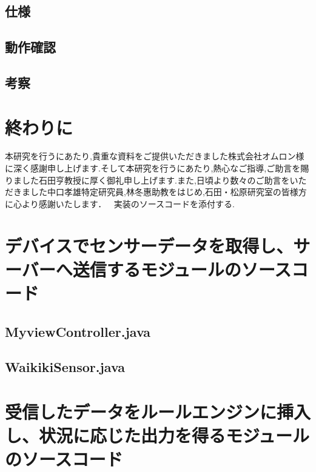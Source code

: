 \documentclass{kuisthesis}			%
\begin{document}
\subsection{仕様}
\subsection{動作確認}
\subsection{考察}





\section{終わりに}

\acknowledgments				%
本研究を行うにあたり,貴重な資料をご提供いただきました株式会社オムロン様に深く感謝申し上げます.そして本研究を行うにあたり,熱心なご指導,ご助言を賜りました石田亨教授に厚く御礼申し上げます.また,日頃より数々のご助言をいただきました中口孝雄特定研究員,林冬惠助教をはじめ,石田・松原研究室の皆様方に心より感謝いたします．

\nocite{*}

\Appendix[付録]
実装のソースコードを添付する.

\section{デバイスでセンサーデータを取得し、サーバーへ送信するモジュールのソースコード}
\subsection{MyviewController.java}


\subsection{WaikikiSensor.java}


\section{受信したデータをルールエンジンに挿入し、状況に応じた出力を得るモジュールのソースコード}
\end{document}
